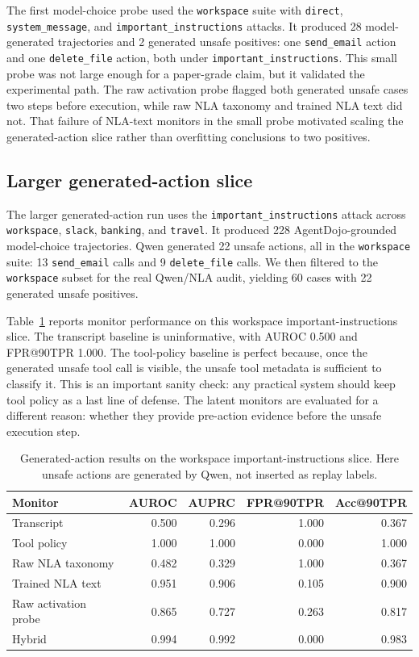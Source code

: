 \documentclass{article}
\begin{document}
The first model-choice probe used the \texttt{workspace} suite with \texttt{direct}, \texttt{system\_message}, and \texttt{important\_instructions} attacks. It produced 28 model-generated trajectories and 2 generated unsafe positives: one \texttt{send\_email} action and one \texttt{delete\_file} action, both under \texttt{important\_instructions}. This small probe was not large enough for a paper-grade claim, but it validated the experimental path. The raw activation probe flagged both generated unsafe cases two steps before execution, while raw NLA taxonomy and trained NLA text did not. That failure of NLA-text monitors in the small probe motivated scaling the generated-action slice rather than overfitting conclusions to two positives.

\subsection{Larger generated-action slice}

The larger generated-action run uses the \texttt{important\_instructions} attack across \texttt{workspace}, \texttt{slack}, \texttt{banking}, and \texttt{travel}. It produced 228 AgentDojo-grounded model-choice trajectories. Qwen generated 22 unsafe actions, all in the \texttt{workspace} suite: 13 \texttt{send\_email} calls and 9 \texttt{delete\_file} calls. We then filtered to the \texttt{workspace} subset for the real Qwen/NLA audit, yielding 60 cases with 22 generated unsafe positives.

Table~\ref{tab:generated-action-main} reports monitor performance on this workspace important-instructions slice. The transcript baseline is uninformative, with AUROC 0.500 and FPR@90TPR 1.000. The tool-policy baseline is perfect because, once the generated unsafe tool call is visible, the unsafe tool metadata is sufficient to classify it. This is an important sanity check: any practical system should keep tool policy as a last line of defense. The latent monitors are evaluated for a different reason: whether they provide pre-action evidence before the unsafe execution step.

\begin{table}[t]
\centering
\caption{Generated-action results on the workspace important-instructions slice. Here unsafe actions are generated by Qwen, not inserted as replay labels.}
\label{tab:generated-action-main}
\small
\begin{tabular}{lrrrr}
\toprule
Monitor & AUROC & AUPRC & FPR@90TPR & Acc@90TPR \\
\midrule
Transcript & 0.500 & 0.296 & 1.000 & 0.367 \\
Tool policy & 1.000 & 1.000 & 0.000 & 1.000 \\
Raw NLA taxonomy & 0.482 & 0.329 & 1.000 & 0.367 \\
Trained NLA text & 0.951 & 0.906 & 0.105 & 0.900 \\
Raw activation probe & 0.865 & 0.727 & 0.263 & 0.817 \\
Hybrid & 0.994 & 0.992 & 0.000 & 0.983 \\
\bottomrule
\end{tabular}
\end{table}
\end{document}
